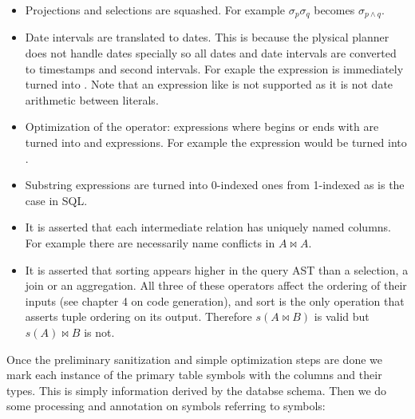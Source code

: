 \begin{itemize}
\item Projections and selections are squashed. For example
  \(\sigma_p\sigma_q\) becomes \(\sigma_{p \land q}\).
\item Date intervals are translated to dates. This is because the
  plysical planner does not handle dates specially so all dates and
  date intervals are converted to timestamps and second intervals. For
  exaple the expression  is
  immediately turned into . Note that an
  expression like  is not
  supported as it is not date arithmetic between literals.
\item Optimization of the  operator:  expressions where 
  begins or ends with \sql{\%} are turned into  and
   expressions. For example the expression  would be turned into .
\item Substring expressions are turned into 0-indexed ones from
  1-indexed as is the case in SQL.
\item It is asserted that each intermediate relation has uniquely
  named columns. For example there are necessarily name conflicts in
  \(A \Join A\).
\item It is asserted that sorting appears higher in the query AST than a
  selection, a join or an aggregation. All three of these operators
  affect the ordering of their inputs (see chapter 4 on code
  generation), and sort is the only operation that asserts tuple
  ordering on its output. Therefore \(s(A \Join B)\) is valid but
  \(s(A) \Join B\) is not.
\end{itemize}

Once the preliminary sanitization and simple optimization steps are
done we mark each instance of the primary table symbols with the
columns and their types. This is simply information derived by the
databse schema. Then we do some processing and annotation on symbols
referring to symbols:

